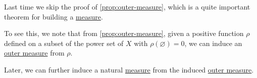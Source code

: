 \begin{prev}
	Last time we skip the proof of \autoref{prop:outer-measure}, which is a quite important theorem for building a \hyperref[def:measure]{measure}.
\end{prev}

To see this, we note that from \autoref{prop:outer-measure}, given a positive function \(\rho \) defined on a subset of the power set of \(X\) with \(\rho (\varnothing ) = 0\), we can induce an \hyperref[def:outer-measure]{outer measure} from \(\rho \).

\begin{note}
	Later, we can further induce a natural \hyperref[def:measure]{measure} from the induced \hyperref[def:outer-measure]{outer measure}.
\end{note}

